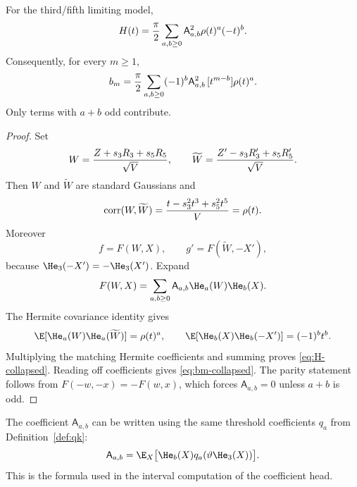 \begin{proposition}\label{prop:collapsed-coefficients}
For the third/fifth limiting model,
\begin{equation}\label{eq:H-collapsed}
  H(t)={\pi\over2}\sum_{a,b\ge0}\mathsf A_{a,b}^2\rho(t)^a(-t)^b.
\end{equation}
Consequently, for every $m\ge1$,
\begin{equation}\label{eq:bm-collapsed}
  b_m={\pi\over2}\sum_{a,b\ge0}(-1)^b\mathsf A_{a,b}^2\,[t^{m-b}]\rho(t)^a.
\end{equation}
Only terms with $a+b$ odd contribute.
\end{proposition}

\begin{proof}
Set
\[
  W={Z+s_3R_3+s_5R_5\over\sqrt V},
  \qquad
  \widetilde W={Z'-s_3R_3'+s_5R_5'\over\sqrt V}.
\]
Then $W$ and $\widetilde W$ are standard Gaussians and
\[
  \mathrm{corr}(W,\widetilde W)={t-s_3^2t^3+s_5^2t^5\over V}=\rho(t).
\]
Moreover
\[
  f=F(W,X),
  \qquad
  g'=F(\widetilde W,-X'),
\]
because $\He_3(-X')=-\He_3(X')$.  Expand
\[
  F(W,X)=\sum_{a,b\ge0}\mathsf A_{a,b}\He_a(W)\He_b(X).
\]
The Hermite covariance identity gives
\[
  \E[\He_a(W)\He_a(\widetilde W)]=\rho(t)^a,
  \qquad
  \E[\He_b(X)\He_b(-X')]=(-1)^b t^b.
\]
Multiplying the matching Hermite coefficients and summing proves \eqref{eq:H-collapsed}.  Reading off coefficients gives \eqref{eq:bm-collapsed}.  The parity statement follows from $F(-w,-x)=-F(w,x)$, which forces $\mathsf A_{a,b}=0$ unless $a+b$ is odd.
\end{proof}

\begin{remark}
The coefficient $\mathsf A_{a,b}$ can be written using the same threshold coefficients $q_a$ from Definition~\ref{def:qk}:
\[
  \mathsf A_{a,b}=\E_X\bigl[\He_b(X)q_a(\vartheta\He_3(X))\bigr].
\]
This is the formula used in the interval computation of the coefficient head.
\end{remark}
